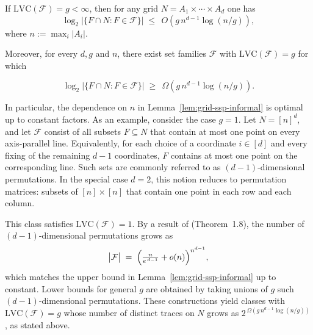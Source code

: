 \documentclass[arxiv]{colt2026}
\newcommand{\F}{\mathcal{F}}
\newcommand{\Pc}{\mathcal{P}}
\newcommand{\LVC}{\mathrm{LVC}}
\newcommand{\shay}[1]{\textcolor{blue}{[Shay: #1]}}
\begin{document}
\begin{lemma}
\label{lem:grid-ssp-informal}
If $\LVC(\F)=g<\infty$, then for any grid
$N=A_1\times\cdots\times A_d$ one has
\[
\log_2 \bigl|\{F\cap N : F\in\F\}\bigr|
\;\le\;
{\,O\!\left(g\,n^{d-1}{\log (n/g)}\right)},
\]
where $n := \max_i |A_i|$. {Moreover, for every $d,g$ and $n$, there exist set families $\F$ with
$\LVC(\F)=g$ for which

\vspace{-0.3em}
\[
\log_2 \bigl|\{F\cap N : F\in\F\}\bigr|
\;\ge\;
{\,\Omega\!\left(g\,n^{d-1}\log (n/g)\right)} .
\]}
\end{lemma}
In particular, the dependence on $n$ in Lemma~\ref{lem:grid-ssp-informal} is optimal up to constant factors.
As an example, consider the case $g=1$.
Let $N=[n]^d$, and let $\F$ consist of all subsets $F\subseteq N$ that contain at
most one point on every axis-parallel line.
Equivalently, for each choice of a coordinate $i\in[d]$ and every fixing of the
remaining $d-1$ coordinates, $F$ contains at most one point on the corresponding
line.
Such sets are commonly referred to as $(d\!-\!1)$-dimensional permutations.
In the special case $d=2$, this notion reduces to permutation matrices: subsets
of $[n]\times[n]$ that contain one point in each row and each column.

This class satisfies $\LVC(\F)=1$.
By a result of \citet{keevash2018} (Theorem~1.8), the number of
$(d\!-\!1)$-dimensional permutations grows as
\[
\bigl|\F\bigr|
\;=\;
\Bigl(\tfrac{n}{e^{\,d-1}}+o(n)\Bigr)^{n^{d-1}} ,
\]
which matches the upper bound in Lemma~\ref{lem:grid-ssp-informal} up to constant.
Lower bounds for general $g$ are obtained by taking unions of $g$ such
$(d\!-\!1)$-dimensional permutations.
These constructions yield classes with $\LVC(\F)=g$ whose number of distinct
traces on $N$ grows as
$2^{\,\Omega(g\,n^{d-1}\log (n/g))}$, as stated above.





\end{document}
